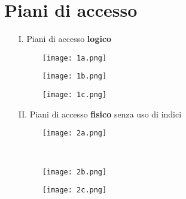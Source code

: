 \section{Piani di accesso}
\begin{enumerate}
	\item[I.] Piani di accesso \textbf{logico}
	\begin{figure}[!h]
		\centering
		\begin{minipage}{\textwidth}
			\centering
			\texttt{[image: 1a.png]}
		\end{minipage}
		\begin{minipage}{\textwidth}
			\centering
			\texttt{[image: 1b.png]}
		\end{minipage}
		\begin{minipage}{\textwidth}
			\centering
			\texttt{[image: 1c.png]}
		\end{minipage}
	\end{figure}
	
	\newpage
	\item[II.] Piani di accesso \textbf{fisico} senza uso di indici
	\begin{figure}[!h]
		\centering
		\begin{minipage}{\textwidth}
			\centering
			\texttt{[image: 2a.png]}
		\end{minipage}\\
		\begin{minipage}{\textwidth}
			\centering
			\texttt{[image: 2b.png]}
		\end{minipage}
	\end{figure}
	\begin{figure}[!h]
		\centering
		\begin{minipage}{\textwidth}
			\centering
			\texttt{[image: 2c.png]}
		\end{minipage}
	\end{figure}
	

\end{enumerate}
